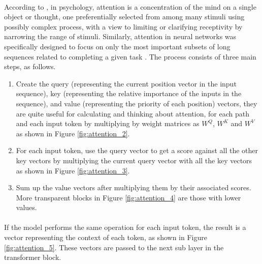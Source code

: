 \paragraph{}
According to \citeauthor{james_1890} \citeyear{james_1890}, in psychology, attention is a concentration of the mind on a single object or thought, one preferentially selected from among many stimuli using possibly complex process, with a view to limiting or clarifying receptivity by narrowing the range of stimuli. Similarly, attention in neural networks was specifically designed to focus on only the most important subsets of long sequences related to completing a given task \cite{alammar_2018,alammar_2019,klingenbrunn_2021}. The process consists of three main steps, as follows.
\begin{enumerate}
\item Create the query (representing the current position vector in the input sequence), key (representing the relative importance of the inputs in the sequence), and value (representing the priority of each position) vectors, they are quite useful for calculating and thinking about attention, for each path and each input token by multiplying by weight matrices as $W^Q$, $W^K$ and $W^V$ as shown in Figure \ref{fig:attention_2}. 
\item For each input token, use the query vector to get a score against all the other key vectors by multiplying the current query vector with all the key vectors as shown in Figure \ref{fig:attention_3}.
\item Sum up the value vectors after multiplying them by their associated scores. More transparent blocks in Figure \ref{fig:attention_4} are those with lower values.

\end{enumerate}

\paragraph{}
If the model performs the same operation for each input token, the result is a vector representing the context of each token, as shown in Figure \ref{fig:attention_5}. These vectors are passed to the next sub layer in the transformer block.

